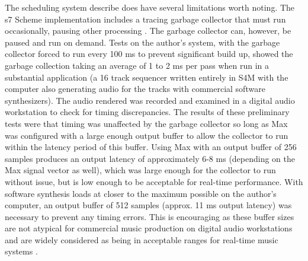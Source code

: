 \documentclass[acmsmall, anonymous, review]{acmart}
\begin{document}
The scheduling system describe does have several limitations worth noting.
The s7 Scheme implementation includes a tracing garbage collector 
that must run occasionally, pausing other processing \cite{Matheussen2020}.
The garbage collector can, however, be paused and run on demand. Tests on the author's
system, with the garbage collector forced to run every 100 ms to prevent
significant build up, showed the garbage collection taking an average of 1 to 2 ms per pass
when run in a substantial application (a 16 track sequencer written entirely in S4M
with the computer also generating audio for the tracks with commercial
software synthesizers).  
The audio rendered was recorded and examined
in a digital audio workstation to check for timing discrepancies. The
results of these preliminary tests were that timing was unaffected by the 
garbage collector so long as Max was configured with 
a large enough output buffer to allow the collector to run within the 
latency period of this buffer.
Using Max with an output buffer of 256 samples produces an output latency
of approximately 6-8 ms (depending on the Max signal vector as well), which
was large enough for the collector to run without issue, but is 
low enough to be acceptable for real-time performance. With software synthesis
loads at closer to the maximum possible on the author's computer,
an output buffer of 512 samples (approx. 11 ms output latency) was necessary to prevent
any timing errors. This is encouraging as these buffer sizes are not atypical
for commercial music production on digital audio workstations and are widely
considered as being in acceptable ranges for real-time music systems \cite{Brandt1998}.
\end{document}
